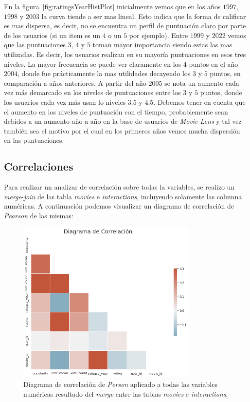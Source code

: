 \documentclass[11pt,a4paper,twoside]{thesis}
\begin{document}
En la figura~\ref{fig:ratingsYearHistPlot} inicialmente vemos que en los años
$1997$, $1998$ y $2003$ la curva tiende a ser mas lineal. Esto indica que la
forma de calificar es mas dispersa, es decir, no se encuentra un perfil de
puntuación claro por parte de los usuarios (si un item es un $4$ o un $5$ por
ejemplo). Entre $1999$ y $2022$ vemos que las puntuaciones $3$, $4$ y $5$ toman
mayor importancia siendo estas las mas utilizadas. Es decir, los usuarios
realizan en su mayoría puntuaciones en esos tres niveles. La mayor frecuencia
se puede ver claramente en los $4$ puntos en el año $2004$, donde fue
prácticamente la mas utilidades decayendo los $3$ y $5$ puntos, en comparación
a años anteriores. A partir del año $2005$ se nota un aumento cada vez más
demarcado en los niveles de puntuaciones entre los $3$ y $5$ puntos, donde los
usuarios cada vez más usan lo niveles $3.5$ y $4.5$. Debemos tener en cuenta
que el aumento en los niveles de puntuación con el tiempo, probablemente sean
debidos a un aumento año a año en la base de usuarios de \textit{Movie Lens} y
tal vez también sea el motivo por el cual en los primeros años vemos mucha
dispersión en las puntuaciones.

\clearpage

\subsection{Correlaciones}

Para realizar un analizar de correlación sobre todas la variables, se realizo
un \textit{merge}-\textit{join} de las tabla \textit{movies} e
\textit{interactions}, incluyendo solamente las columna numéricas. A
continuación podemos visualizar un diagrama de correlación de \textit{Pearson}
de las mismas:

\begin{figure}[h!]
	\centering
	\includegraphics[width=9cm]{./images/Correlations.png}
	\caption{Diagrama de correlación de \textit{Person} aplicado a
		todas las variables numéricas resultado del \textit{merge}
		entre las tablas \textit{movies} e \textit{interactions}.}
	\label{fig:correlationPlot}
\end{figure}
\end{document}
